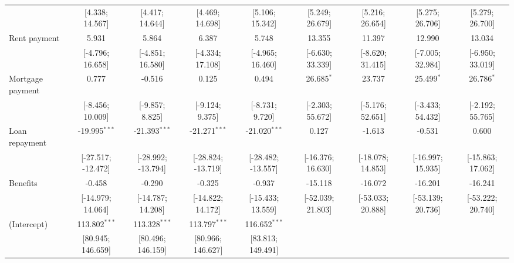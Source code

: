 \begin{table}[htbp]
\begin{threeparttable}[b]
\begin{tabular}{lcccccccc}
                                & [4.338; 14.567]    & [4.417; 14.644]    & [4.469; 14.698]    & [5.106; 15.342]    & [5.249; 26.679]     & [5.216; 26.654]     & [5.275; 26.706]     & [5.279; 26.700]\\   
         Rent payment           & 5.931              & 5.864              & 6.387              & 5.748              & 13.355              & 11.397              & 12.990              & 13.034\\   
                                & [-4.796; 16.658]   & [-4.851; 16.580]   & [-4.334; 17.108]   & [-4.965; 16.460]   & [-6.630; 33.339]    & [-8.620; 31.415]    & [-7.005; 32.984]    & [-6.950; 33.019]\\   
         Mortgage payment       & 0.777              & -0.516             & 0.125              & 0.494              & 26.685$^{*}$        & 23.737              & 25.499$^{*}$        & 26.786$^{*}$\\   
                                & [-8.456; 10.009]   & [-9.857; 8.825]    & [-9.124; 9.375]    & [-8.731; 9.720]    & [-2.303; 55.672]    & [-5.176; 52.651]    & [-3.433; 54.432]    & [-2.192; 55.765]\\   
         Loan repayment         & -19.995$^{***}$    & -21.393$^{***}$    & -21.271$^{***}$    & -21.020$^{***}$    & 0.127               & -1.613              & -0.531              & 0.600\\   
                                & [-27.517; -12.472] & [-28.992; -13.794] & [-28.824; -13.719] & [-28.482; -13.557] & [-16.376; 16.630]   & [-18.078; 14.853]   & [-16.997; 15.935]   & [-15.863; 17.062]\\   
         Benefits               & -0.458             & -0.290             & -0.325             & -0.937             & -15.118             & -16.072             & -16.201             & -16.241\\   
                                & [-14.979; 14.064]  & [-14.787; 14.208]  & [-14.822; 14.172]  & [-15.433; 13.559]  & [-52.039; 21.803]   & [-53.033; 20.888]   & [-53.139; 20.736]   & [-53.222; 20.740]\\   
         (Intercept)            & 113.802$^{***}$    & 113.328$^{***}$    & 113.797$^{***}$    & 116.652$^{***}$    &                     &                     &                     &   \\   
                                & [80.945; 146.659]  & [80.496; 146.159]  & [80.966; 146.627]  & [83.813; 149.491]  &                     &                     &                     &   \\   

\end{tabular}
\end{threeparttable}
\end{table}
